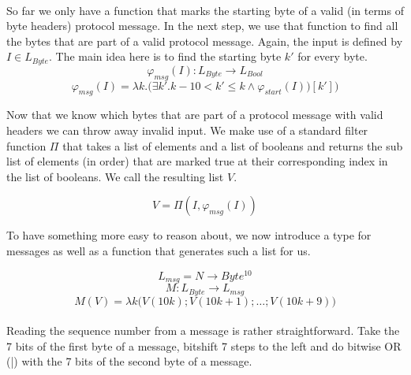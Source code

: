 \documentclass[fleqn]{kththesis}
\begin{document}
\paragraph{}
So far we only have a function that marks the starting byte of a valid (in terms of byte headers) protocol message. In the next step, we use that function to find all the bytes that are part of a valid protocol message. Again, the input is defined by $I \in L_{Byte}$. The main idea here is to find the starting byte $k'$ for every byte. 
\begin{equation*}
	\varphi_{msg}(I) \colon L_{Byte} \rightarrow L_{Bool}
\end{equation*}
\begin{equation*}
	\varphi_{msg}(I) = \lambda k .\Bigg(
	\exists k' . k-10 < k' \leq k \land \varphi_{start}(I))[k'] \Bigg)
\end{equation*}

Now that we know which bytes that are part of a protocol message with valid headers we can throw away invalid input. We make use of a standard filter function $\varPi$ that takes a list of elements and a list of booleans and returns the sub list of elements (in order) that are marked true at their corresponding index in the list of booleans. We call the resulting list $V$.

\begin{equation*}
V = \varPi(I, \varphi_{msg}(I))
\end{equation*}

To have something more easy to reason about, we now introduce a type for messages as well as a function that generates such a list for us. 

\begin{equation*}
L_{msg} = N \rightarrow Byte^{10}
\end{equation*}
\begin{equation*}
M \colon L_{Byte} \rightarrow L_{msg}
\end{equation*}
\begin{equation*}
M(V) = \lambda k \Bigg( V(10k); V(10k+1); \dots ;V(10k+9)
\Bigg)
\end{equation*}

\paragraph{}
Reading the sequence number from a message is rather straightforward. Take the 7 bits of the first byte of a message, bitshift 7 steps to the left and do bitwise OR (|) with the 7 bits of the second byte of a message.
\end{document}
